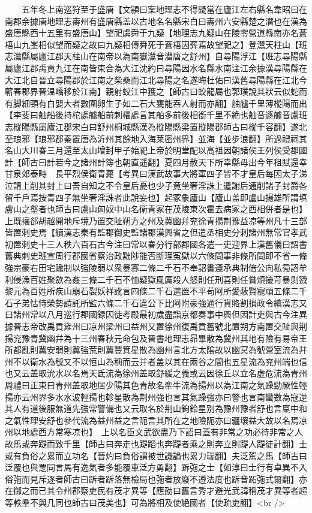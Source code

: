 　　五年冬上南巡狩至于盛唐【文頴曰案地理志不得疑當在廬江左右縣名韋昭曰在南郡余據唐地理志夀州有盛唐縣盖以古地名名縣宋白曰夀州六安縣楚之潛也在漢為盛唐縣西十五里有盛唐山】望祀虞舜于九疑【地理志九疑山在陵零營道縣南亦名蒼梧山九峯相似望而疑之故曰九疑相傳舜死于蒼梧因葬焉故望祀之】登灊天柱山【班志灊縣屬廬江郡天柱山在南帝以為南嶽灊音潜唐之舒州】自尋陽浮江【班志尋陽縣屬廬江郡禹貢九江在南皆東合為大江沈約曰尋陽因水名縣水南注江余據漢尋陽縣在大江北自晉立尋陽郡於江南之柴桑而江北尋陽之名遂晦杜佑曰漢舊尋陽縣在江北今蘄春郡界晉温嶠移於江南】親射蛟江中獲之【師古曰蛟龍屬也郭璞說其狀云似蛇而有脚細頸有白嬰大者數圍卵生子如二石大甕能吞人射而亦翻】舳艫千里薄樅陽而出【李斐曰舳船後持柁處艫船前刺櫂處言其船多前後相銜千里不絶也舳音逐艫音盧班志樅陽縣屬廬江郡宋白曰舒州桐城縣漢為樅陽縣梁置樅陽郡師古曰樅千容翻】遂北至琅邪【琅邪郡秦置唐為沂州其餘地入海莱密州界】並海【並步浪翻】所過禮祠其名山大川春三月還至太山增封甲子始祀上帝於明堂配以高祖因朝諸侯王列侯受郡國計【師古曰計若今之諸州計簿也朝直遥翻】夏四月赦天下所幸縣毋出今年租賦還幸甘泉郊泰畤　長平烈侯衛青薨【考異曰漢武故事大將軍四子皆不才皇后每因太子涕泣請上削其封上曰吾自知之不令皇后憂也少子竟坐奢淫誅上遣謝后通削諸子封爵各留千戶焉按青四子無坐奢淫誅者此說妄也】起冢象廬山【廬山盖即盧山揚雄所謂填盧山之壑者也師古曰盧山匈奴中山名衛青冢在茂陵東次霍去病冢之西相併者是也】上既攘郤胡越開地斥境乃置交阯朔方之州及冀幽幷兖徐青揚荆豫益凉等州凡十三部皆置刺史焉【續漢志秦有監郡御史監諸郡漢興省之但遣丞相史分刺諸州無常官孝武初置刺史十三人秩六百石古今注曰常以春分行部郡國各遣一吏迎界上漢舊儀曰詔書舊典刺史班宣周行郡國省察治政黜陟能否斷理寃獄以六條問事非條所問即不省一條強宗豪右田宅踰制以強陵弱以衆暴寡二條二千石不奉詔書遵承典制倍公向私㫄詔牟利侵漁百姓聚歛為姦三條二千石不恤疑獄風厲殺人怒則任刑喜則任賞煩擾苛暴剝戮黎元為百姓所疾山崩石裂妖祥訛言四條二千石選置不平苟阿所愛蔽賢寵頑五條二千石子弟怙恃榮勢請託所監六條二千石違公下比阿附豪強通行貨賂割損政令續漢志又曰諸州常以八月巡行郡國録囚徒考殿最初歲盡詣京都奏事中興但因計吏與古今注異據晉志帝改禹貢雍州曰凉州梁州曰益州又置徐州復禹貢舊號北置朔方南置交阯與荆揚兖豫青冀幽幷為十三州春秋元命包及晉書地理志昴畢散為冀州其地有險有易帝王所都亂則冀安弱則冀強荒則冀豐箕星散為幽州言北方太隂故以幽冥為號營室流為幷州不以衛水為號又不以恒山為稱而云并者盖以其在兩谷之間也五星流為兖州端也信也又云盖取沇水以名焉天氐流為徐州盖取舒緩之義或云因徐丘以立名虚危流為青州周禮曰正東曰青州盖取地居少陽其色青故名牽牛流為揚州以為江南之氣躁勁厥性輕揚亦云州界多水水波輕揚也軫星散為荆州強也言其氣躁強亦曰警也言南蠻數為寇逆其人有道後服無道先強常警備也又云取名於荆山鉤鈴星别為豫州豫者舒也言稟中和之氣性理安舒也參代流為益州益之言阨言其所在之地險阨亦曰疆壤益大故以名焉凉州以地處西方常寒凉也】　上以名臣文武欲盡乃下詔曰蓋有非常之功必待非常之人故馬或奔踶而致千里【師古曰奔走也踶蹈也奔踶者乘之則奔立則踶人踶徒計翻】士或有負俗之累而立功名【晉灼曰負俗謂被世譏論也累力瑞翻】夫泛駕之馬【師古曰泛覆也與覂同言馬有逸氣者多能覆車泛方勇翻】跅㢮之士【如淳曰士行有卓異不入俗㢮而見斥逐者師古曰跅者跅落無檢局也㢮者放廢不遵法度也跅音跖㢮式爾翻】亦在御之而已其令州郡察吏民有茂才異等【應劭曰舊言秀才避光武諱稱茂才異等者超等軼羣不與几同也師古曰茂美也】可為將相及使絶國者【使疏吏翻】<br />
